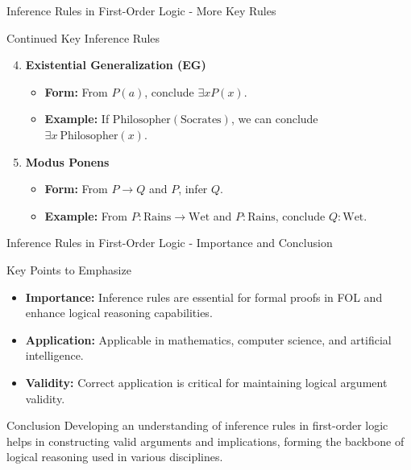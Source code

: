 \documentclass[aspectratio=169]{beamer}
\begin{document}
\begin{frame}[fragile]{Inference Rules in First-Order Logic - More Key Rules}
    \begin{block}{Continued Key Inference Rules}
        \begin{enumerate}
            \setcounter{enumi}{3}
            \item \textbf{Existential Generalization (EG)}
                \begin{itemize}
                    \item \textbf{Form:} From $P(a)$, conclude $\exists x P(x)$.
                    \item \textbf{Example:} If $\text{Philosopher}(\text{Socrates})$, we can conclude $\exists x \ \text{Philosopher}(x)$.
                \end{itemize}

            \item \textbf{Modus Ponens}
                \begin{itemize}
                    \item \textbf{Form:} From $P \rightarrow Q$ and $P$, infer $Q$.
                    \item \textbf{Example:} From $P: \text{Rains} \rightarrow \text{Wet}$ and $P: \text{Rains}$, conclude $Q: \text{Wet}$.
                \end{itemize}
        \end{enumerate}
    \end{block}
\end{frame}

\begin{frame}[fragile]{Inference Rules in First-Order Logic - Importance and Conclusion}
    \begin{block}{Key Points to Emphasize}
        \begin{itemize}
            \item \textbf{Importance:} Inference rules are essential for formal proofs in FOL and enhance logical reasoning capabilities.
            \item \textbf{Application:} Applicable in mathematics, computer science, and artificial intelligence.
            \item \textbf{Validity:} Correct application is critical for maintaining logical argument validity.
        \end{itemize}
    \end{block}

    \begin{block}{Conclusion}
        Developing an understanding of inference rules in first-order logic helps in constructing valid arguments and implications, forming the backbone of logical reasoning used in various disciplines.
    \end{block}
\end{frame}
\end{document}
